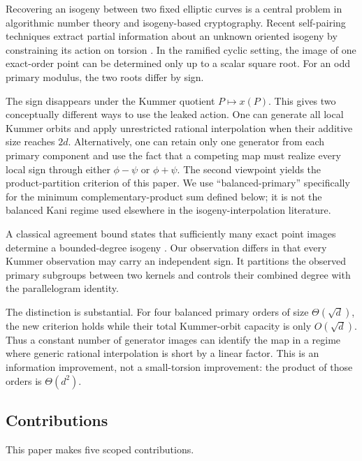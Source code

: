 \documentclass[11pt]{article}
\begin{document}
Recovering an isogeny between two fixed elliptic curves is a central problem
in algorithmic number theory and isogeny-based cryptography.  Recent
self-pairing techniques extract partial information about an unknown oriented
isogeny by constraining its action on torsion
\cite{castryck-selfpairings,macula-stange,ggr-volcanoes}.  In the ramified
cyclic setting, the image of one exact-order point can be determined only up
to a scalar square root.  For an odd primary modulus, the two roots differ by
sign.

The sign disappears under the Kummer quotient $P\mapsto x(P)$.  This gives
two conceptually different ways to use the leaked action.  One can generate
all local Kummer orbits and apply unrestricted rational interpolation when
their additive size reaches $2d$.  Alternatively, one can retain only one
generator from each primary component and use the fact that a competing map
must realize every local sign through either $\phi-\psi$ or $\phi+\psi$.
The second viewpoint yields the product-partition criterion of this paper.  We
use ``balanced-primary'' specifically for the minimum complementary-product
sum defined below; it is not the balanced Kani regime used elsewhere in the
isogeny-interpolation literature.

A classical agreement bound states that sufficiently many exact point images
determine a bounded-degree isogeny \cite{urbanik-jao}.  Our observation differs
in that every Kummer observation may carry an independent sign.  It partitions
the observed primary subgroups between two kernels and controls their combined
degree with the parallelogram identity.

The distinction is substantial.  For four balanced primary orders of size
$\Theta(\sqrt d)$, the new criterion holds while their total Kummer-orbit
capacity is only $O(\sqrt d)$.  Thus a constant number of generator images
can identify the map in a regime where generic rational interpolation is
short by a linear factor.  This is an information improvement, not a
small-torsion improvement: the product of those orders is $\Theta(d^2)$.

\subsection{Contributions}

This paper makes five scoped contributions.
\end{document}
